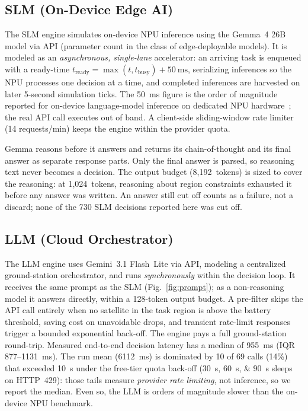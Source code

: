 \documentclass[conference,comsoc,twoside,caption=false]{IEEEtran}
\theoremstyle{definition}
\begin{document}
\subsection{SLM (On-Device Edge AI)}
The SLM engine simulates on-device NPU inference using the Gemma~4 26B model
via API (parameter count in the class of edge-deployable models). It is modeled
as an \emph{asynchronous, single-lane} accelerator: an arriving task is enqueued
with a ready-time $t_{\mathrm{ready}} = \max(t, t_{\mathrm{busy}}) + \SI{50}{\milli\second}$,
serializing inferences so the NPU processes one decision at a time, and completed
inferences are harvested on later 5-second simulation ticks. The
\SI{50}{\milli\second} figure is the order of magnitude reported for on-device
language-model inference on dedicated NPU hardware~\cite{wang2025}; the real API
call executes out of band. A client-side sliding-window rate limiter (14
requests/min) keeps the engine within the provider quota.

Gemma reasons before it answers and returns its chain-of-thought and its final
answer as separate response parts. Only the final answer is parsed, so reasoning
text never becomes a decision. The output budget (8,192~tokens) is sized to cover
the reasoning: at 1,024~tokens, reasoning about region constraints exhausted it
before any answer was written. An answer still cut off counts as a failure, not
a discard; none of the 730 SLM decisions reported here was cut off.

\subsection{LLM (Cloud Orchestrator)}
The LLM engine uses Gemini~3.1 Flash~Lite via API, modeling a centralized
ground-station orchestrator, and runs \emph{synchronously} within the decision
loop. It receives the same prompt as the SLM (Fig.~\ref{fig:prompt}); as a
non-reasoning model it answers directly, within a 128-token output budget. A pre-filter skips the API call entirely
when no satellite in the task region is above the battery threshold, saving cost
on unavoidable drops, and transient rate-limit responses trigger a bounded
exponential back-off. The engine pays a full ground-station round-trip. Measured end-to-end decision
latency has a median of \SI{955}{\milli\second} (\ac{IQR} \numrange{877}{1131}~ms).
The run mean (\SI{6112}{\milli\second}) is dominated by 10 of 69 calls (14\%)
that exceeded \SI{10}{\second} under the free-tier quota back-off
(\SIlist{30;60;90}{\second} sleeps on HTTP~429): those tails measure
\emph{provider rate limiting}, not inference, so we report the median. Even so,
the LLM is orders of magnitude slower than the on-device NPU benchmark.
\end{document}
